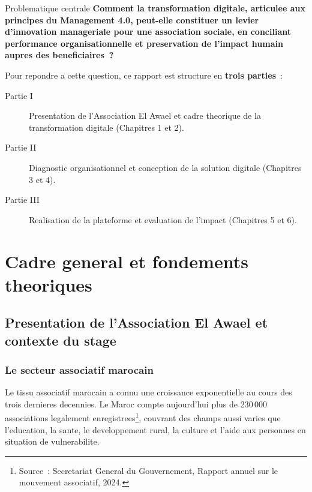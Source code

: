 \documentclass[12pt,a4paper,openany]{report}
\begin{document}
\begin{encadre}{Problematique centrale}
\textbf{Comment la transformation digitale, articulee aux principes du
Management 4.0, peut-elle constituer un levier d'innovation manageriale
pour une association sociale, en conciliant performance organisationnelle
et preservation de l'impact humain aupres des beneficiaires~?}
\end{encadre}

\vspace{0.3cm}
Pour repondre a cette question, ce rapport est structure en
\textbf{trois parties}~:

\begin{description}
  \item[Partie I] Presentation de l'Association El Awael et cadre
    theorique de la transformation digitale (Chapitres 1 et 2).
  \item[Partie II] Diagnostic organisationnel et conception de la
    solution digitale (Chapitres 3 et 4).
  \item[Partie III] Realisation de la plateforme et evaluation de
    l'impact (Chapitres 5 et 6).
\end{description}

\part{Cadre general et fondements theoriques}

\chapter{Presentation de l'Association El Awael et contexte du stage}

\section{Le secteur associatif marocain}

Le tissu associatif marocain a connu une croissance exponentielle au
cours des trois dernieres decennies. Le Maroc compte aujourd'hui plus
de 230\,000 associations legalement enregistrees\footnote{Source~:
Secretariat General du Gouvernement, Rapport annuel sur le mouvement
associatif, 2024.}, couvrant des champs aussi varies que l'education,
la sante, le developpement rural, la culture et l'aide aux personnes
en situation de vulnerabilite.
\end{document}
